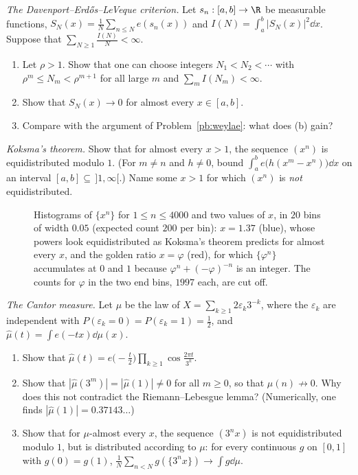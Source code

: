 \begin{exercise}[$\star\star\star$]\label{pb:del}
\emph{The Davenport--Erdős--LeVeque criterion.} Let $s_n:[a,b]\to\R$ be measurable functions, $S_N(x)=\frac1N\sum_{n\le N}e(s_n(x))$ and
$I(N)=\int_a^b|S_N(x)|^2\dd x$. Suppose that $\sum_{N\ge1}\frac{I(N)}N<\infty$.
\begin{enumerate}[label=(\alph*)]
\item Let $\rho>1$. Show that one can choose integers $N_1<N_2<\cdots$ with $\rho^m\le N_m<\rho^{m+1}$ for all large $m$ and $\sum_mI(N_m)<\infty$.
\item Show that $S_N(x)\to0$ for almost every $x\in[a,b]$.
\item Compare with the argument of Problem~\ref{pb:weylae}: what does (b) gain?
\end{enumerate}
\end{exercise}

\begin{exercise}[$\star\star\star$]\label{pb:koksma}
\emph{Koksma's theorem.} Show that for almost every $x>1$, the sequence $(x^n)$ is equidistributed modulo $1$. (For $m\ne n$ and $h\ne0$, bound
$\int_a^be\bigl(h(x^m-x^n)\bigr)\dd x$ on an interval $[a,b]\subseteq\,]1,\infty[$.) Name some $x>1$ for which $(x^n)$ is \emph{not} equidistributed.
\end{exercise}

\begin{figure}[ht]
\centering
{}
\caption{Histograms of $\{x^n\}$ for $1\le n\le 4000$ and two values of $x$, in $20$ bins of width $0.05$ (expected count $200$ per bin): $x=1.37$ (blue),
whose powers look equidistributed as Koksma's theorem predicts for almost every $x$, and the golden ratio $x=\varphi$ (red), for which $\{\varphi^n\}$
accumulates at $0$ and $1$ because $\varphi^n+(-\varphi)^{-n}$ is an integer. The counts for $\varphi$ in the two end bins, $1997$ each, are cut off.}\label{fig:koksma}
\end{figure}

\begin{exercise}[$\star\star$]\label{pb:cantorfourier}
\emph{The Cantor measure.} Let $\mu$ be the law of $X=\sum_{k\ge1}2\varepsilon_k3^{-k}$, where the $\varepsilon_k$ are independent with
$P(\varepsilon_k=0)=P(\varepsilon_k=1)=\frac12$, and $\hat\mu(t)=\int e(-tx)\dd\mu(x)$.
\begin{enumerate}[label=(\alph*)]
\item Show that $\hat\mu(t)=e\bigl(-\frac t2\bigr)\prod_{k\ge1}\cos\frac{2\pi t}{3^k}$.
\item Show that $|\hat\mu(3^m)|=|\hat\mu(1)|\ne0$ for all $m\ge0$, so that $\hat\mu(n)\not\to0$. Why does this not contradict the Riemann--Lebesgue
lemma? (Numerically, one finds $|\hat\mu(1)|=0.37143\ldots$)
\item Show that for $\mu$-almost every $x$, the sequence $(3^nx)$ is not equidistributed modulo $1$, but is distributed according to $\mu$: for every
continuous $g$ on $[0,1]$ with $g(0)=g(1)$, $\frac1N\sum_{n<N}g(\{3^nx\})\to\int g\dd\mu$.
\end{enumerate}
\end{exercise}

